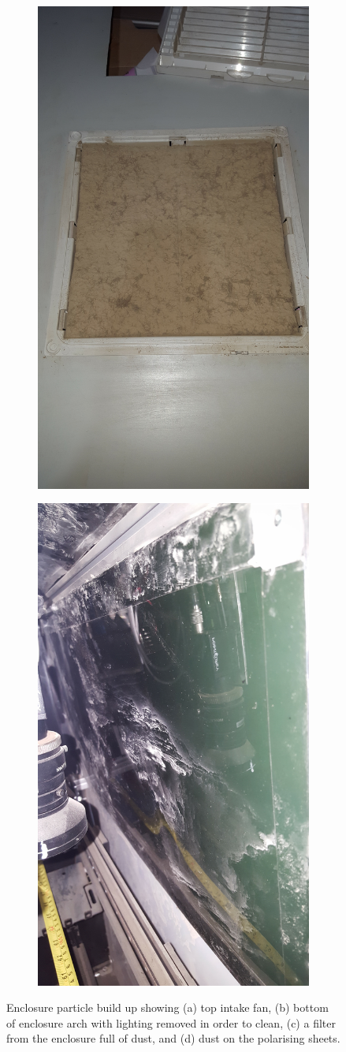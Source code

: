 \documentclass[fleqn,twoside]{article}
\begin{document}
\begin{figure}[ht]
\begin{subfigure}{.25\textwidth}
		\caption{}
		\label{fig:dirt_2}
	\end{subfigure}%
	\begin{subfigure}{.25\textwidth}
		\centering
		\includegraphics[height=0.9\linewidth,angle=270]{dirt_3.jpg}
		\caption{}
		\label{fig:dirt_3}
	\end{subfigure}%
	\begin{subfigure}{.25\textwidth}
		\centering
		\includegraphics[height=0.9\linewidth,angle=270]{dirt_4.jpg}
		\caption{}
		\label{fig:dirt_4}
	\end{subfigure}%
	
	\caption{Enclosure particle build up showing (a) top intake fan, (b) bottom of enclosure arch with lighting removed in order to clean, (c) a filter from the enclosure full of dust, and (d) dust on the polarising sheets.}
	\label{fig:dirty_enclosure}
\end{figure}
\end{document}
